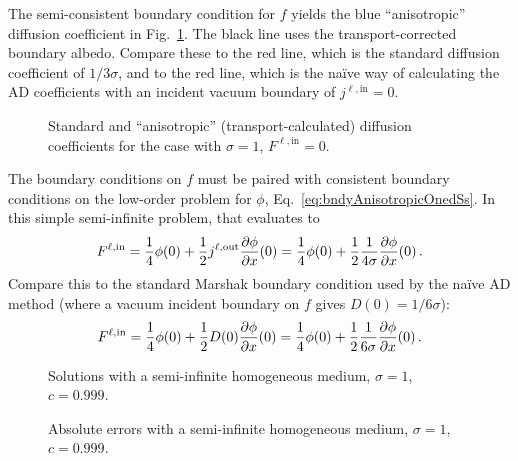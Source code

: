 The semi-consistent boundary condition for $f$ yields the blue ``anisotropic''
diffusion coefficient in
Fig.~\ref{fig:bndycondDcoeff}.  The black line uses the transport-corrected
boundary albedo.  Compare these to the red line, which is the
standard diffusion coefficient of $1/3\sigma$, and to the red line, which
is the na\"ive way of calculating the AD coefficients with an incident
vacuum boundary of $j^{\ell,\mathrm{in}}=0$.
\begin{figure}[htb]
  \centering
  
  \caption{Standard and ``anisotropic'' (transport-calculated) diffusion
  coefficients for the case with $\sigma=1$, $F^{\ell,\mathrm{in}}=0$.}
  \label{fig:bndycondDcoeff}
\end{figure}

The boundary conditions on $f$ must be paired with consistent boundary
conditions on the low-order problem for $\phi$,
Eq.~\eqref{eq:bndyAnisotropicOnedSs}. In this simple semi-infinite problem,
that evaluates to
\begin{equation*}
  F^{\ell,\mathrm{in}}
  = \frac{1}{4} \phi(0)
  + \frac{1}{2} j^{\ell,\mathrm{out}} \frac{\partial \phi}{\partial x}(0)
  = \frac{1}{4} \phi(0)
  + \frac{1}{2} \frac{1}{4\sigma} \frac{\partial \phi}{\partial x}(0) \,.
\end{equation*}
Compare this to the standard Marshak boundary condition used by the na\"ive AD
method (where a vacuum incident boundary on $f$ gives $D(0)=1/6\sigma$):
\begin{equation*}
  F^{\ell,\mathrm{in}}
  = \frac{1}{4} \phi(0)
  + \frac{1}{2} D(0) \frac{\partial \phi}{\partial x}(0)
  = \frac{1}{4} \phi(0)
  + \frac{1}{2} \frac{1}{6\sigma} \frac{\partial \phi}{\partial x}(0) \,.
\end{equation*}

\begin{figure}[htb]
  \centering
  \hspace{-.6in}
  \subfigure[$q=0.001$, $F^{\ell,\mathrm{in}}=0$]{
  
  }
  \hspace{-.2in}
  \subfigure[$q=0$, $F^{\ell,\mathrm{in}}=1$]{
  
  }
  \hspace{-.6in}
  \caption{Solutions with a semi-infinite homogeneous medium, $\sigma=1$,
  $c=0.999$.}
  \label{fig:bndycondSolutions}
\end{figure}

\begin{figure}[htb]
  \centering
  \hspace{-.6in}
  \subfigure[$q=0.001$, $F^{\ell,\mathrm{in}}=0$]{
  
  }
  \hspace{-.2in}
  \subfigure[$q=0$, $F^{\ell,\mathrm{in}}=1$]{
  
  }
  \hspace{-.6in}
  \caption{Absolute errors with a semi-infinite homogeneous medium, $\sigma=1$,
  $c=0.999$.}
  \label{fig:bndycondErrors}
\end{figure}

